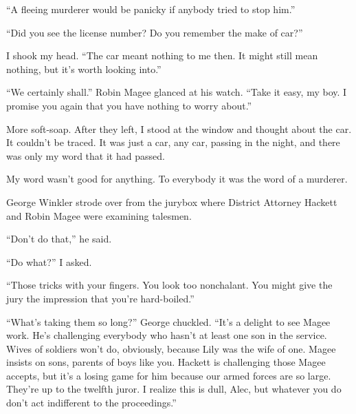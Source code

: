 \documentclass{novel}
\begin{document}
“A fleeing murderer would be panicky if anybody tried to stop him.”

“Did you see the license number? Do you remember the make of car?”

I shook my head. “The car meant nothing to me then. It might still mean nothing, but it’s worth looking into.”

“We certainly shall.” Robin Magee glanced at his watch. “Take it easy, my boy. I promise you again that you have nothing to worry about.”

More soft-soap. After they left, I stood at the window and thought about the car. It couldn’t be traced. It was just a car, any car, passing in the night, and there was only my word that it had passed.

My word wasn’t good for anything. To everybody it was the word of a murderer.

\vspace{2\nbs}
\clearpage
\thispagestyle{empty}


\begin{ChapterStart}
\vspace{3\nbs}
\end{ChapterStart}

George Winkler strode over from the jurybox where District Attorney Hackett and Robin Magee were examining talesmen.

“Don’t do that,” he said.

“Do what?” I asked.

“Those tricks with your fingers. You look too nonchalant. You might give the jury the impression that you’re hard-boiled.”

“What’s taking them so long?” George chuckled. “It’s a delight to see Magee work. He’s challenging everybody who hasn’t at least one son in the service. Wives of soldiers won’t do, obviously, because Lily was the wife of one. Magee insists on sons, parents of boys like you. Hackett is challenging those Magee accepts, but it’s a losing game for him because our armed forces are so large. They’re up to the twelfth juror. I realize this is dull, Alec, but whatever you do don’t act indifferent to the proceedings.”
\end{document}
